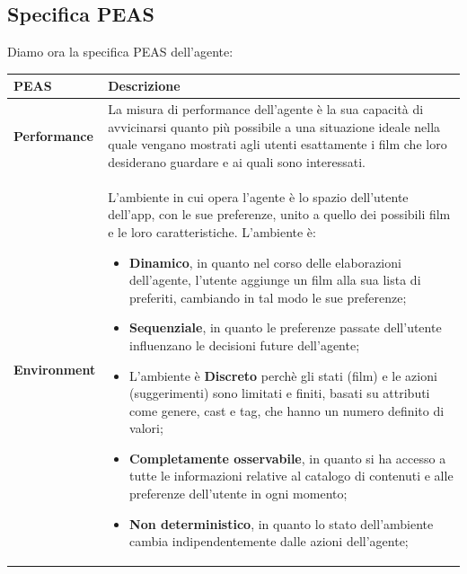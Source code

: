 \documentclass[a4paper,12pt]{article}
\begin{document}
\subsection{Specifica PEAS} 
Diamo ora la specifica PEAS dell'agente:
\begin{table}[h!]
    \centering
    \renewcommand{\arraystretch}{1.5} %
    \setlength{\tabcolsep}{8pt} %
    \begin{tabularx}{\textwidth}{|>{\columncolor[HTML]{CFE2F3}}l|X|}
        \hline
        \rowcolor[HTML]{CFE2F3} 
        \textbf{PEAS}              & \textbf{Descrizione}                                                                                                                                                                                                                                                                                         \\ \hline
        \textbf{Performance}       & La misura di performance dell'agente è la sua capacità di avvicinarsi quanto più possibile a una situazione ideale nella quale vengano mostrati agli utenti esattamente i film che loro desiderano guardare e ai quali sono interessati.                                                                                           				\\ \hline
        \textbf{Environment}       & L’ambiente in cui opera l’agente è lo spazio dell'utente dell'app, con le sue preferenze, unito a quello dei possibili film e le loro caratteristiche. L’ambiente è:
                            \begin{itemize}
                              \item \textbf{Dinamico}, in quanto nel corso delle elaborazioni dell’agente, l'utente aggiunge un film alla sua lista di preferiti, cambiando in tal modo le sue preferenze;
                              \item \textbf{Sequenziale}, in quanto le preferenze passate dell'utente influenzano le decisioni future dell’agente;
			\item 	L'ambiente è \textbf{Discreto} perchè gli stati (film) e le azioni (suggerimenti) sono limitati e finiti, basati su attributi come genere, cast e tag, che hanno un numero definito di valori;
                              \item \textbf{Completamente osservabile}, in quanto si ha accesso a tutte le informazioni relative al catalogo di contenuti e alle preferenze dell'utente in ogni momento;
                              \item \textbf{Non deterministico}, in quanto lo stato dell’ambiente cambia indipendentemente dalle azioni dell’agente;

\end{itemize}
\end{tabularx}
\end{table}
\end{document}
